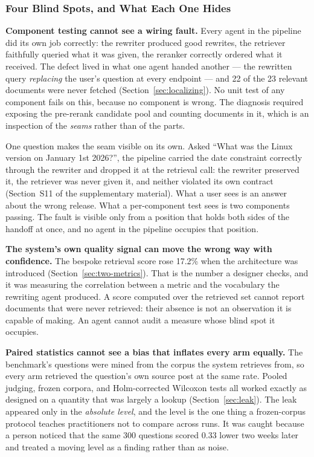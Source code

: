 \documentclass[acmsmall,review,anonymous,screen]{acmart}
\begin{document}
\subsubsection{Four Blind Spots, and What Each One Hides}

\textbf{Component testing cannot see a wiring fault.} Every agent in the
pipeline did its own job correctly: the rewriter produced good rewrites, the
retriever faithfully queried what it was given, the reranker correctly ordered
what it received. The defect lived in what one agent handed another --- the
rewritten query \emph{replacing} the user's question at every endpoint --- and
22 of the 23 relevant documents were never fetched
(Section~\ref{sec:localizing}). No unit test of any component fails on this,
because no component is wrong. The diagnosis required
exposing the pre-rerank candidate pool and counting documents in it, which is an
inspection of the \emph{seams} rather than of the parts.

One question makes the seam visible on its own. Asked ``What was the Linux
version on January 1st 2026?'', the pipeline carried the date constraint
correctly through the rewriter and dropped it at the retrieval call: the
rewriter preserved it, the retriever was never given it, and neither violated
its own contract (Section~S11 of the supplementary material). What a user sees
is an answer about the wrong release. What a per-component test sees is two
components passing. The fault is visible only from a position that holds both
sides of the handoff at once, and no agent in the pipeline occupies that
position.

\textbf{The system's own quality signal can move the wrong way with
confidence.} The bespoke retrieval score rose 17.2\% when the architecture was
introduced (Section~\ref{sec:two-metrics}). That is the number a designer
checks, and it was measuring the correlation between a metric and the
vocabulary the rewriting agent produced. A score computed over the retrieved
set cannot report documents that were never retrieved: their absence is not an
observation it is capable of making. An agent cannot audit a measure whose
blind spot it occupies.

\textbf{Paired statistics cannot see a bias that inflates every arm equally.}
The benchmark's questions were mined from the corpus the system retrieves from,
so every arm retrieved the question's own source post at the same rate. Pooled
judging, frozen corpora, and Holm-corrected Wilcoxon tests all worked exactly
as designed on a quantity that was largely a lookup (Section~\ref{sec:leak}).
The leak appeared only in the \emph{absolute level}, and the level is the one
thing a frozen-corpus protocol teaches practitioners not to compare across
runs. It was caught because a person noticed that the same 300 questions scored
0.33 lower two weeks later and treated a moving level as a finding rather than
as noise.
\end{document}
